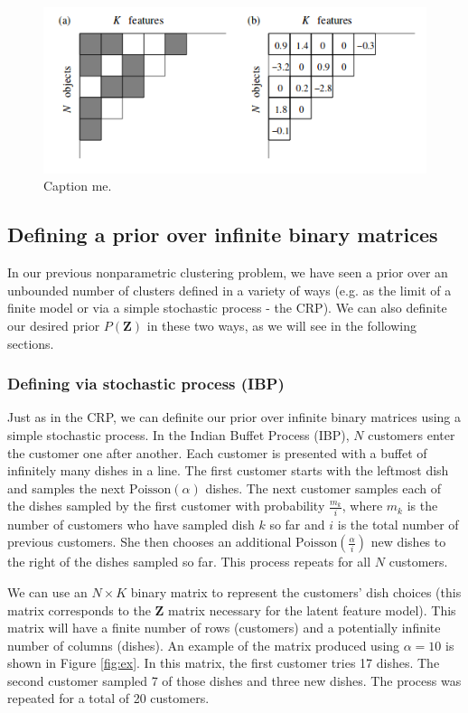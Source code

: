 \documentclass[twoside]{article}
\begin{document}
\begin{figure}[h]
  \centering
    \includegraphics[scale=0.70]{fzv}
  \caption{Caption me.}
  \label{fig:decomp}
\end{figure}

\subsection{Defining a prior over infinite binary matrices}
In our previous nonparametric clustering problem, we have seen a prior over an unbounded number of clusters defined in a variety of ways (e.g. as the limit of a finite model or via a simple stochastic process - the CRP). We can also definite our desired prior $P(\mathbf{Z})$ in these two ways, as we will see in the following sections.

\subsubsection{Defining via stochastic process (IBP)}
Just as in the CRP, we can definite our prior over infinite binary matrices using a simple stochastic process. In the Indian Buffet Process (IBP), $N$ customers enter the customer one after another. Each customer is presented with a buffet of infinitely many dishes in a line. The first customer starts with the leftmost dish and samples the next $\text{Poisson}(\alpha)$ dishes. The next customer samples each of the dishes sampled by the first customer with probability $\frac{m_k}{i}$, where $m_k$ is the number of customers who have sampled dish $k$ so far and $i$ is the total number of previous customers. She then chooses an additional $\text{Poisson}(\frac{\alpha}{i})$ new dishes to the right of the dishes sampled so far. This process repeats for all $N$ customers.

We can use an $N \times K$ binary matrix to represent the customers' dish choices (this matrix corresponds to the $\mathbf{Z}$ matrix necessary for the latent feature model). This matrix will have a finite number of rows (customers) and a potentially infinite number of columns (dishes).  An example of the matrix produced using $\alpha = 10$ is shown in Figure \ref{fig:ex}. In this matrix, the first customer tries 17 dishes. The second customer sampled 7 of those dishes and three new dishes. The process was repeated for a total of 20 customers.
\end{document}
